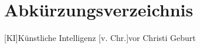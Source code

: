 \section*{Abkürzungsverzeichnis}
\begin{acronym}
	[KI]{Künstliche Intelligenz}
	[v. Chr.]{vor Christi Geburt}
\end{acronym}